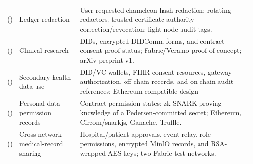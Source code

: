 \begin{longtable}{@{}>{\raggedright\arraybackslash}m{}>{\raggedright\arraybackslash}m{}>{\raggedright\arraybackslash}m{}@{}}
\addlinespace[5pt]
\cite{updateMiao2026PermissionSupervision} (\citeyear{updateMiao2026PermissionSupervision}) & Ledger redaction & User-requested chameleon-hash redaction; rotating redactors; trusted-certificate-authority correction/revocation; light-node audit tags. \\
\addlinespace[5pt]
\cite{updateNaghmouchi2026ClinConNet} (\citeyear{updateNaghmouchi2026ClinConNet}) & Clinical research & DIDs, encrypted DIDComm forms, and contract consent-proof status; Fabric/Veramo proof of concept; arXiv preprint v1. \\
\addlinespace[5pt]
\cite{updatePhuyal2026Architecture} (\citeyear{updatePhuyal2026Architecture}) & Secondary health-data use & DID/VC wallets, FHIR consent resources, gateway authorization, off-chain records, and on-chain audit references; Ethereum-compatible design. \\
\addlinespace[5pt]
\cite{updateScaramuzza2026ZKConsent} (\citeyear{updateScaramuzza2026ZKConsent}) & Personal-data permission records & Contract permission states; zk-SNARK proving knowledge of a Pedersen-committed secret; Ethereum, Circom/snarkjs, Ganache, Truffle. \\
\addlinespace[5pt]
\cite{updateHemlata2026DualCare} (\citeyear{updateHemlata2026DualCare}) & Cross-network medical-record sharing & Hospital/patient approvals, event relay, role permissions, encrypted MinIO records, and RSA-wrapped AES keys; two Fabric test networks. \\
\end{longtable}
\endgroup

